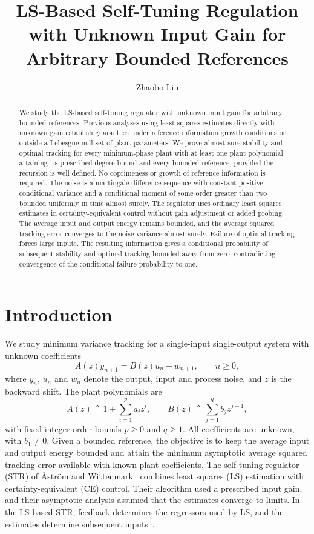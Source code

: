 \documentclass[11pt,reqno]{amsart}
\title[LS-Based Self-Tuning Regulation with Unknown Input Gain]{LS-Based Self-Tuning Regulation with Unknown Input Gain for Arbitrary Bounded References}
\author{Zhaobo Liu}
\date{}
\numberwithin{equation}{section}
\theoremstyle{definition}
\theoremstyle{remark}
\begin{document}
\begin{abstract}
We study the LS-based self-tuning regulator with unknown input gain for arbitrary bounded references. Previous analyses using least squares estimates directly with unknown gain establish guarantees under reference information growth conditions or outside a Lebesgue null set of plant parameters. We prove almost sure stability and optimal tracking for every minimum-phase plant with at least one plant polynomial attaining its prescribed degree bound and every bounded reference, provided the recursion is well defined. No coprimeness or growth of reference information is required. The noise is a martingale difference sequence with constant positive conditional variance and a conditional moment of some order greater than two bounded uniformly in time almost surely. The regulator uses ordinary least squares estimates in certainty-equivalent control without gain adjustment or added probing. The average input and output energy remains bounded, and the average squared tracking error converges to the noise variance almost surely. Failure of optimal tracking forces large inputs. The resulting information gives a conditional probability of subsequent stability and optimal tracking bounded away from zero, contradicting convergence of the conditional failure probability to one.
\end{abstract}
\maketitle
\section{Introduction}\label{sec:introduction}
We study minimum variance tracking for a single-input single-output system with unknown coefficients
\begin{equation}\label{eq:plant}
 A(z)y_{n+1}=B(z)u_n+w_{n+1},\qquad n\ge0,
\end{equation}
where $y_n$, $u_n$ and $w_n$ denote the output, input and process noise, and $z$ is the backward shift. The plant polynomials are
\begin{equation*}
 A(z)\triangleq 1+\sum_{i=1}^p a_i z^i,\qquad
 B(z)\triangleq \sum_{j=1}^q b_jz^{j-1},
\end{equation*}
with fixed integer order bounds $p\ge0$ and $q\ge1$. All coefficients are unknown, with $b_1\ne0$. Given a bounded reference, the objective is to keep the average input and output energy bounded and attain the minimum asymptotic average squared tracking error available with known plant coefficients. The self-tuning regulator (STR) of {\AA}str{\"o}m and Wittenmark~\cite{AW73} combines least squares (LS) estimation with certainty-equivalent (CE) control. Their algorithm used a prescribed input gain, and their asymptotic analysis assumed that the estimates converge to limits. In the LS-based STR, feedback determines the regressors used by LS, and the estimates determine subsequent inputs~\cite{LW82}.
\end{document}
